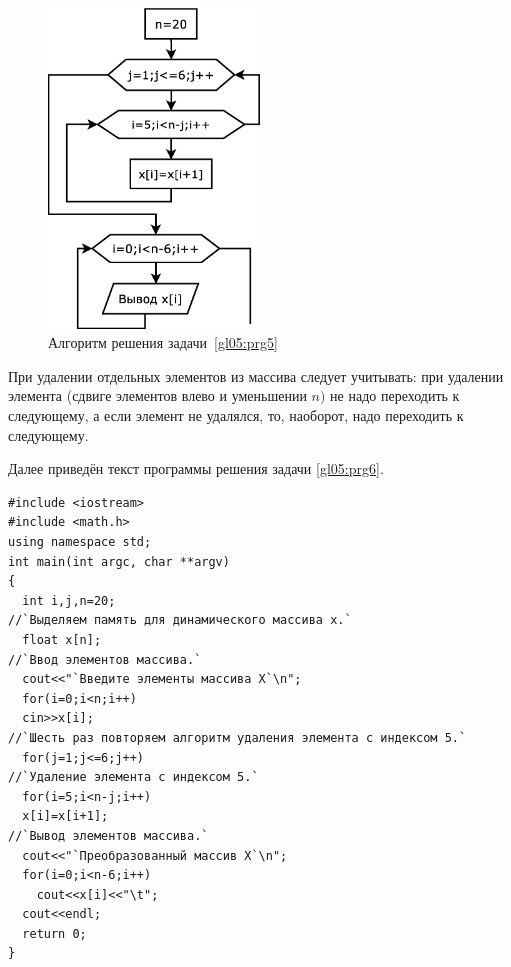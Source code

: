  
\begin{figure}[htb]
\begin{center}
\includegraphics[width=0.5\textwidth]{img/ris_5_11}
\caption{Алгоритм решения задачи~\ref{gl05:prg5}}
\label{ch05:refDrawing10}
\end{center}
\end{figure}


При удалении отдельных элементов из массива следует учитывать: при удалении элемента (сдвиге элементов влево и
уменьшении $n)$ не надо переходить к следующему, а если элемент не удалялся, то, наоборот, надо переходить к следующему.

Далее приведён текст программы решения задачи \ref{gl05:prg6}.
\begin{lstlisting}
#include <iostream>
#include <math.h>
using namespace std;
int main(int argc, char **argv)
{
  int i,j,n=20;
//`Выделяем память для динамического массива x.`
  float x[n];
//`Ввод элементов массива.`
  cout<<"`Введите элементы массива X`\n";
  for(i=0;i<n;i++)
  cin>>x[i];
//`Шесть раз повторяем алгоритм удаления элемента с индексом 5.`
  for(j=1;j<=6;j++)
//`Удаление элемента с индексом 5.`
  for(i=5;i<n-j;i++)
  x[i]=x[i+1];
//`Вывод элементов массива.`
  cout<<"`Преобразованный массив X`\n";
  for(i=0;i<n-6;i++)
    cout<<x[i]<<"\t";
  cout<<endl;
  return 0;
}
\end{lstlisting}



